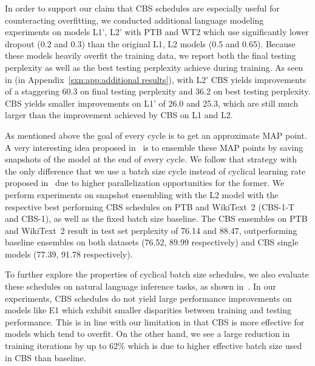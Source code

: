 In order to support our claim that CBS schedules are especially useful for counteracting overfitting, we conducted additional language modeling experiments on models L1', L2' with PTB and WT2 which use significantly lower dropout (0.2 and 0.3) than the original L1, L2 models (0.5 and 0.65). Because these models heavily overfit the training data, we report both the final testing perplexity as well as the best testing perplexity achieve during training. 
As seen in  (in Appendix~\ref{sxn:app:additional results}), with L2' CBS yields improvements of a staggering 60.3 on final testing perplexity and 36.2 on best testing perplexity. CBS yields smaller improvements on L1' of 26.0 and 25.3, which are still much larger than the improvement achieved by CBS on L1 and L2. 


As mentioned above the goal of every cycle is to get an approximate MAP point. A very interesting idea
proposed in~\citep{huang2017snapshot} is to ensemble these MAP points by saving snapshots of the model
at the end of every cycle. We follow that strategy with the only difference that we use a batch size cycle
instead of cyclical learning rate proposed in~\citep{huang2017snapshot} due to higher parallelization opportunities for the former.
We perform experiments on snapshot ensembling with the L2 model with the respective best performing CBS schedules on PTB and WikiText~2 (CBS-1-T and CBS-1), as well as the fixed batch size baseline.
The CBS ensembles on PTB and WikiText~2 result in test set perplexity of 76.14 and 88.47, outperforming baseline ensembles on both datasets (76.52, 89.99 respectively) and CBS single models (77.39, 91.78 respectively).


To further explore the properties of cyclical batch size schedules, we also evaluate these schedules on natural language inference tasks, as shown in~. In our experiments, CBS schedules do not yield large performance improvements on models like E1 which exhibit smaller disparities between training and testing performance.
This is in line with our limitation in that CBS is more effective for models which tend to overfit. On the other hand, we see a large reduction in training 
iterations by up to 62\% which is due to higher effective batch size used in CBS than baseline.



